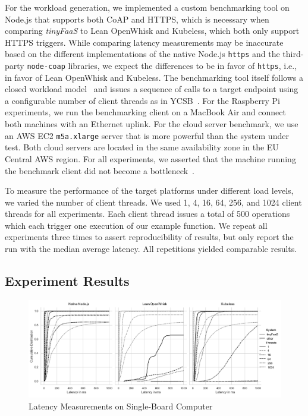 For the workload generation, we implemented a custom benchmarking tool on Node.js that supports both CoAP and HTTPS, which is necessary when comparing \textit{tinyFaaS} to Lean OpenWhisk and Kubeless, which both only support HTTPS triggers.
While comparing latency measurements may be inaccurate based on the different implementations of the native Node.js \texttt{https} and the third-party \texttt{node-coap} libraries, we expect the differences to be in favor of \texttt{https}, i.e., in favor of Lean OpenWhisk and Kubeless.
The benchmarking tool itself follows a closed workload model~\cite{paper_schroeder_open_closed_workloads,book_bermbach_cloud_service_benchmarking} and issues a sequence of calls to a target endpoint using a configurable number of client threads as in YCSB~\cite{paper_cooper_ycsb}.
For the Raspberry Pi experiments, we run the benchmarking client on a MacBook Air and connect both machines with an Ethernet uplink.
For the cloud server benchmark, we use an AWS EC2 \texttt{m5a.xlarge} server that is more powerful than the system under test.
Both cloud servers are located in the same availability zone in the EU Central AWS region.
For all experiments, we asserted that the machine running the benchmark client did not become a bottleneck~\cite{book_bermbach_cloud_service_benchmarking}.

To measure the performance of the target platforms under different load levels, we varied the number of client threads.
We used 1, 4, 16, 64, 256, and 1024 client threads for all experiments.
Each client thread issues a total of 500 operations which each trigger one execution of our example function.
We repeat all experiments three times to assert reproducibility of results, but only report the run with the median average latency.
All repetitions yielded comparable results.


\subsection{Experiment Results}
\label{sec:discussion}

\begin{figure}[ht]
    \centering
    \includegraphics[width=1\columnwidth]{fig/pigraph.pdf}
    \caption{Latency Measurements on Single-Board Computer}
    \label{fig:pigraph}
\end{figure}


